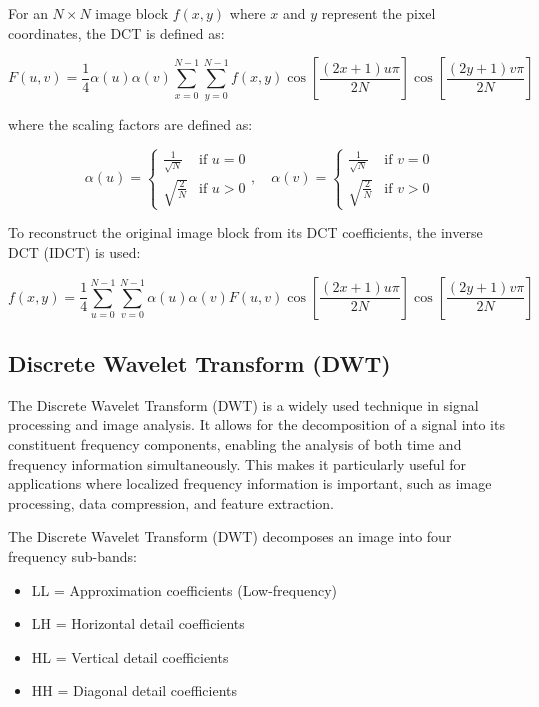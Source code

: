 For an $N \times N$ image block $f(x, y)$ where $x$ and $y$ represent the pixel coordinates, the DCT is defined as:

\begin{equation}
F(u, v) = \frac{1}{4}\alpha(u)\alpha(v) \sum_{x=0}^{N-1} \sum_{y=0}^{N-1} f(x, y) \cos\left[\frac{(2x + 1)u\pi}{2N}\right] \cos\left[\frac{(2y + 1)v\pi}{2N}\right]
\end{equation}

where the scaling factors are defined as:

\begin{equation}
\alpha(u) = \begin{cases} \frac{1}{\sqrt{N}} & \text{if } u = 0 \\ \sqrt{\frac{2}{N}} & \text{if } u > 0 \end{cases}, \quad \alpha(v) = \begin{cases} \frac{1}{\sqrt{N}} & \text{if } v = 0 \\ \sqrt{\frac{2}{N}} & \text{if } v > 0 \end{cases}
\end{equation}

To reconstruct the original image block from its DCT coefficients, the inverse DCT (IDCT) is used:

\begin{equation}
f(x, y) = \frac{1}{4} \sum_{u=0}^{N-1} \sum_{v=0}^{N-1} \alpha(u)\alpha(v)F(u, v) \cos\left[\frac{(2x + 1)u\pi}{2N}\right] \cos\left[\frac{(2y + 1)v\pi}{2N}\right]
\end{equation}

\subsection{Discrete Wavelet Transform (DWT)}

The Discrete Wavelet Transform (DWT) is a widely used technique in signal processing and image analysis. It allows for the decomposition of a signal into its constituent frequency components, enabling the analysis of both time and frequency information simultaneously. This makes it particularly useful for applications where localized frequency information is important, such as image processing, data compression, and feature extraction.

The Discrete Wavelet Transform (DWT) decomposes an image into four frequency sub-bands:
\begin{itemize}
    \item LL = Approximation coefficients (Low-frequency)
    \item LH = Horizontal detail coefficients
    \item HL = Vertical detail coefficients
    \item HH = Diagonal detail coefficients
\end{itemize}

